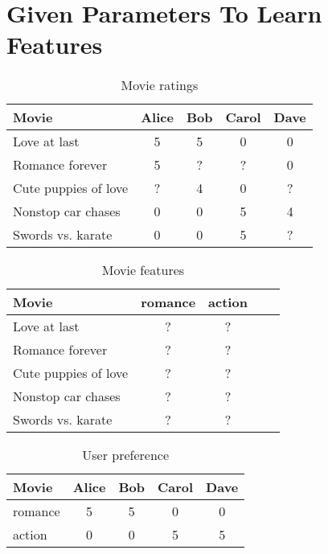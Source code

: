 \section{Given Parameters To Learn Features}
\begin{table}[H]
    \caption{Movie ratings}
    \centering
    \begin{tabular}{lcccc}
        \hline %
        Movie                & Alice & Bob & Carol & Dave \\ 
        \hline %
        Love at last         & 5     & 5   & 0     & 0    \\ 
        Romance forever      & 5     & ?   & ?     & 0    \\ 
        Cute puppies of love & ?     & 4   & 0     & ?    \\ 
        Nonstop car chases   & 0     & 0   & 5     & 4    \\ 
        Swords vs. karate    & 0     & 0   & 5     & ?    \\ 
        \hline %
    \end{tabular}
\end{table} 


\begin{table}[H]
    \caption{Movie features}
    \centering
    \begin{tabular}{lcccc}
        \hline %
        Movie                & romance & action \\ 
        \hline %
        Love at last         & ?    & ?   \\ 
        Romance forever      & ?    & ?   \\ 
        Cute puppies of love & ?    & ?   \\ 
        Nonstop car chases   & ?    & ?   \\ 
        Swords vs. karate    & ?    & ?   \\ 
        \hline %
    \end{tabular}
\end{table} 


\begin{table}[H]
    \caption{User preference}
    \centering
    \begin{tabular}{lcccc}
        \hline %
        Movie       & Alice & Bob & Carol & Dave \\ 
        \hline %
        romance     & 5     & 5   & 0     & 0    \\ 
        action      & 0     & 0   & 5     & 5    \\ 
        \hline %
    \end{tabular}
\end{table} 


